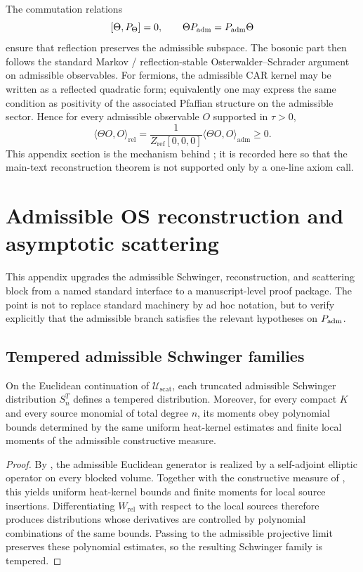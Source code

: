 The commutation relations
\[
[\Theta,P_\Theta]=0,
\qquad
\Theta P_{\mathrm{adm}}=P_{\mathrm{adm}}\Theta
\]
ensure that reflection preserves the admissible subspace. The bosonic part then follows the standard Markov / reflection-stable Osterwalder--Schrader argument on admissible observables. For fermions, the admissible CAR kernel may be written as a reflected quadratic form; equivalently one may express the same condition as positivity of the associated Pfaffian structure on the admissible sector. Hence for every admissible observable $O$ supported in $\tau>0$,
\[
\langle \Theta O,O\rangle_{\mathrm{rel}}
=
\frac{1}{Z_{\mathrm{ref}}[0,0,0]}
\langle \Theta O,O\rangle_{\mathrm{adm}}
\ge 0.
\]
This appendix section is the mechanism behind ; it is recorded here so that the main-text reconstruction theorem is not supported only by a one-line axiom call.

\section{Admissible OS reconstruction and asymptotic scattering}
\label{app:os-scattering}

This appendix upgrades the admissible Schwinger, reconstruction, and scattering block from a named
standard interface to a manuscript-level proof package. The point is not to replace standard
machinery by ad hoc notation, but to verify explicitly that the admissible branch satisfies the
relevant hypotheses on $P_{\mathrm{adm}}$.

\subsection{Tempered admissible Schwinger families}

\begin{lemma}
\label{lem:tempered-schwinger-bounds}
On the Euclidean continuation of $\mathcal U_{\mathrm{scat}}$, each truncated admissible Schwinger
distribution $S_n^T$ defines a tempered distribution. Moreover, for every compact $K$ and every
source monomial of total degree $n$, its moments obey polynomial bounds determined by the same
uniform heat-kernel estimates and finite local moments of the admissible constructive measure.
\end{lemma}

\begin{proof}
By , the admissible Euclidean generator is realized by a
self-adjoint elliptic operator on every blocked volume. Together with the constructive measure of
, this yields uniform heat-kernel bounds and finite moments
for local source insertions. Differentiating $W_{\mathrm{rel}}$ with respect to the local sources
therefore produces distributions whose derivatives are controlled by polynomial combinations of the
same bounds. Passing to the admissible projective limit preserves these polynomial estimates, so the
resulting Schwinger family is tempered.
\end{proof}

